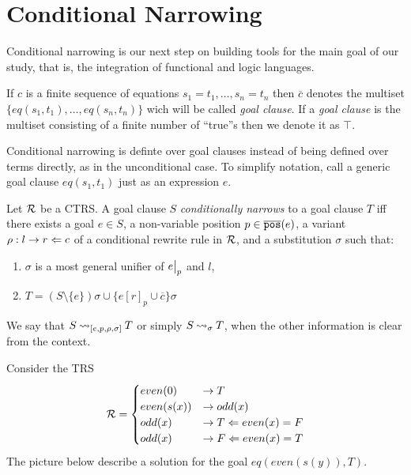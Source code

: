 \section{Conditional Narrowing}
Conditional narrowing is our next step on building tools for the main goal of our study, that is, the integration of functional and logic languages.

\begin{definition}
    If $c$ is a finite sequence of equations $s_1 = t_1, \dots, s_n = t_n$ then $\overline{c}$ denotes the multiset $\{ eq(s_1, t_1), \dots, eq(s_n, t_n) \}$ wich will be called \textit{goal clause}. If a \textit{goal clause} is the multiset consisting of a finite number of ``true''s then we denote it as $\top$.
\end{definition}

Conditional narrowing is definte over goal clauses instead of being defined over terms directly, as in the unconditional case. To simplify notation, call a generic goal clause $eq(s_1, t_1)$ just as an expression $e$.

\begin{definition}
    Let $\mathcal{R}$ be a CTRS. A goal clause $S$ \textit{conditionally narrows} to a goal clause $T$ iff there exists a goal $e \in S$, a non-variable position $p \in \overline{\mathtt{pos}}(e)$, a variant $\rho : l \rightarrow r \Leftarrow c$ of a conditional rewrite rule in $\mathcal{R}$, and a substitution $\sigma$ such that:
    \begin{enumerate}
        \item $\sigma$ is a most general unifier of $\restr{e}{p}$ and $l$,
        \item $T = (S \setminus \{e\})\sigma \cup \{ e[r]_p \cup \overline{c} \}\sigma$
    \end{enumerate}
    We say that $S \mathbin{\rightsquigarrow}_{[e, p, \rho, \sigma]} T$ or simply $S \mathbin{\rightsquigarrow}_\sigma T$, when the other information is clear from the context.
\end{definition}

\begin{example}
    Consider the TRS
    \begin{displaymath}
        \mathcal{R} =
        \begin{cases}
            even(0) & \rightarrow T                               \\
            even(s(x)) & \rightarrow odd(x) \\
            odd(x) & \rightarrow T \Leftarrow even(x) = F \\
            odd(x) & \rightarrow F \Leftarrow even(x) = T
        \end{cases}
    \end{displaymath}
    The picture below describe a solution for the goal $eq(even(s(y)), T)$.
\end{example}

